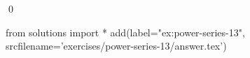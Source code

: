 
    \begin{ex}
  \label{ex:power-series-13}
  
  \qed
\end{ex}
\begin{python0}
from solutions import *
add(label="ex:power-series-13",
    srcfilename='exercises/power-series-13/answer.tex') 
\end{python0}                              
